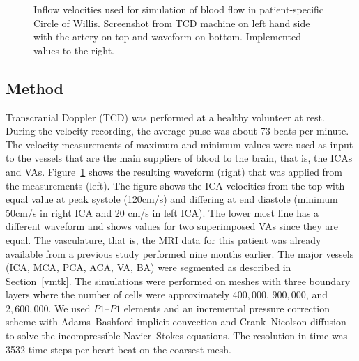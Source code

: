 \begin{figure}
  \begin{center}
  \end{center}
  \caption{Inflow velocities used for simulation of blood flow in
    patient-specific Circle of Willis. Screenshot from TCD machine on
    left hand side with the artery on top and waveform on
    bottom. Implemented values to the right.}
  \label{fig:cok_inflow}
\end{figure}

\subsection{Method}

Transcranial Doppler (TCD) was performed at a healthy volunteer at
rest. During the velocity recording, the average pulse was about 73
beats per minute. The velocity measurements of maximum and minimum
values were used as input to the vessels that are the main suppliers
of blood to the brain, that is, the ICAs and
VAs. Figure~\ref{fig:cok_inflow} shows the resulting waveform (right)
that was applied from the measurements (left). The figure shows the
ICA velocities from the top with equal value at peak systole (120cm/s)
and differing at end diastole (minimum 50cm/s in right ICA and 20 cm/s
in left ICA). The lower most line has a different waveform and shows
values for two superimposed VAs since they are equal. The vasculature,
that is, the MRI data for this patient was already available from a
previous study performed nine months earlier. The major vessels (ICA,
MCA, PCA, ACA, VA, BA) were segmented as described in
Section~\ref{vmtk}. The simulations were performed on meshes with
three boundary layers where the number of cells were approximately
$400,000$, $900,000$, and $2,600,000$. We used $P1$--$P1$ elements and
an incremental pressure correction scheme with Adams--Bashford
implicit convection and Crank--Nicolson diffusion to solve the
incompressible Navier--Stokes equations. The resolution in time was
3532 time steps per heart beat on the coarsest mesh.

